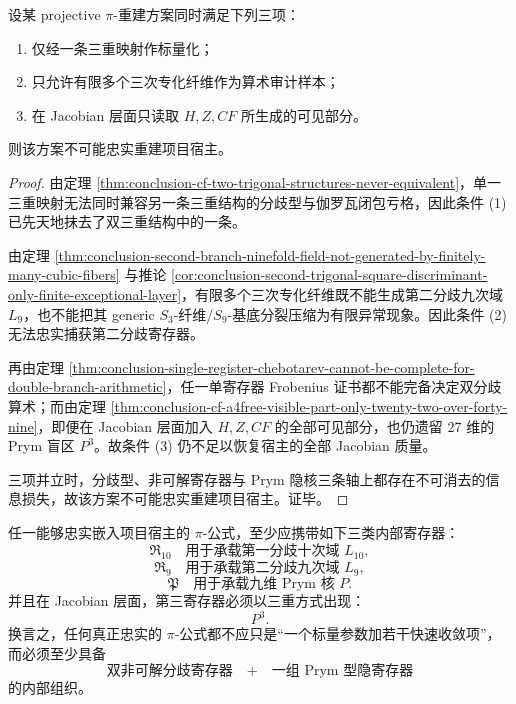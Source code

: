 \begin{theorem}[有限标量三重化重建原则之不可能性]\label{thm:conclusion-finite-scalar-trigonal-reconstruction-impossible}
设某 projective \(\pi\)-重建方案同时满足下列三项：
\begin{enumerate}
  \item 仅经一条三重映射作标量化；
  \item 只允许有限多个三次专化纤维作为算术审计样本；
  \item 在 Jacobian 层面只读取 \(H,Z,CF\) 所生成的可见部分。
\end{enumerate}
则该方案不可能忠实重建项目宿主。
\end{theorem}
\begin{proof}
由定理 \ref{thm:conclusion-cf-two-trigonal-structures-never-equivalent}，单一三重映射无法同时兼容另一条三重结构的分歧型与伽罗瓦闭包亏格，因此条件 (1) 已先天地抹去了双三重结构中的一条。

由定理 \ref{thm:conclusion-second-branch-ninefold-field-not-generated-by-finitely-many-cubic-fibers} 与推论 \ref{cor:conclusion-second-trigonal-square-discriminant-only-finite-exceptional-layer}，有限多个三次专化纤维既不能生成第二分歧九次域 \(L_9\)，也不能把其 generic \(S_3\)-纤维/\(S_9\)-基底分裂压缩为有限异常现象。因此条件 (2) 无法忠实捕获第二分歧寄存器。

再由定理 \ref{thm:conclusion-single-register-chebotarev-cannot-be-complete-for-double-branch-arithmetic}，任一单寄存器 Frobenius 证书都不能完备决定双分歧算术；而由定理 \ref{thm:conclusion-cf-a4free-visible-part-only-twenty-two-over-forty-nine}，即便在 Jacobian 层面加入 \(H,Z,CF\) 的全部可见部分，也仍遗留 \(27\) 维的 Prym 盲区 \(P^3\)。故条件 (3) 仍不足以恢复宿主的全部 Jacobian 质量。

三项并立时，分歧型、非可解寄存器与 Prym 隐核三条轴上都存在不可消去的信息损失，故该方案不可能忠实重建项目宿主。证毕。
\end{proof}

\begin{conjecture}\label{conj:conclusion-faithful-pi-formula-needs-three-registers}
任一能够忠实嵌入项目宿主的 \(\pi\)-公式，至少应携带如下三类内部寄存器：
\[
\mathfrak R_{10}
\quad\text{用于承载第一分歧十次域 }L_{10},
\]
\[
\mathfrak R_{9}
\quad\text{用于承载第二分歧九次域 }L_9,
\]
\[
\mathfrak P
\quad\text{用于承载九维 Prym 核 }P.
\]
并且在 Jacobian 层面，第三寄存器必须以三重方式出现：
\[
P^3.
\]
换言之，任何真正忠实的 \(\pi\)-公式都不应只是“一个标量参数加若干快速收敛项”，而必须至少具备
\[
\text{双非可解分歧寄存器}
\quad+\quad
\text{一组 Prym 型隐寄存器}
\]
的内部组织。
\end{conjecture}
